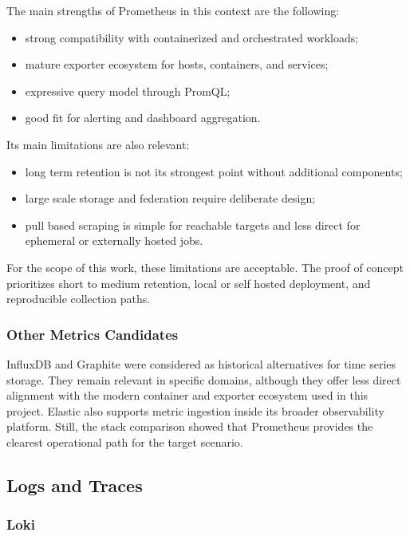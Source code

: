 The main strengths of Prometheus in this context are the following:
\begin{itemize}
    \item strong compatibility with containerized and orchestrated workloads;
    \item mature exporter ecosystem for hosts, containers, and services;
    \item expressive query model through PromQL;
    \item good fit for alerting and dashboard aggregation.
\end{itemize}

Its main limitations are also relevant:
\begin{itemize}
    \item long term retention is not its strongest point without additional components;
    \item large scale storage and federation require deliberate design;
    \item pull based scraping is simple for reachable targets and less direct for ephemeral or externally hosted jobs.
\end{itemize}

For the scope of this work, these limitations are acceptable. The proof of concept prioritizes short to medium retention, local or self hosted deployment, and reproducible collection paths.

\subsubsection{Other Metrics Candidates}
\label{subsubsec:other_monitoring}

InfluxDB and Graphite were considered as historical alternatives for time series storage. They remain relevant in specific domains, although they offer less direct alignment with the modern container and exporter ecosystem used in this project. Elastic also supports metric ingestion inside its broader observability platform. Still, the stack comparison showed that Prometheus provides the clearest operational path for the target scenario.

\subsection{Logs and Traces}
\label{subsec:logging_tools}

\subsubsection{Loki}
\label{subsubsec:loki}

